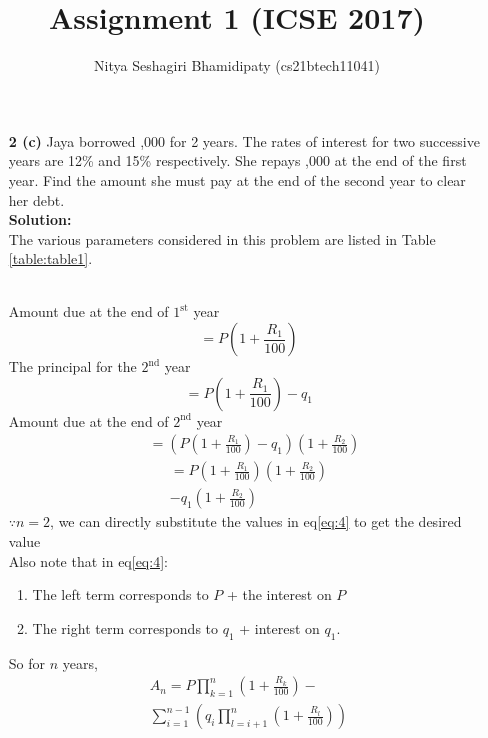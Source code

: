 \documentclass[journal,12pt,two column]{IEEEtran}
\title{Assignment 1 (ICSE 2017)}
\author{Nitya Seshagiri Bhamidipaty (cs21btech11041)}
\newcommand{\solution}{\noindent \textbf{Solution: }}
\begin{document}
\maketitle
\begin{enumerate}
\item[\textbf{2 (c)}] Jaya borrowed ,000 for 2 years. The rates of interest for two successive years are 12\% and 15\% respectively. She repays ,000 at the end of the first year. Find the amount she must pay at the end of the second year to clear her debt.\\
\solution \\
The various parameters considered in this problem are listed in Table \ref{table:table1}.
\begin{table}[h!]
\caption{}
\label{table:table1}

\end{table}
\\
Amount due at the end of $1^{\text{st}}$ year
\begin{equation}
= P\left(1+\frac{R_1}{100}\right)
\end{equation}
The principal for the $2^{\text{nd}}$ year
\begin{equation}
     = P\left(1+\frac{R_1}{100}\right) - q_1
\end{equation}
Amount due at the end of $2^{\text{nd}}$ year
\begin{align}
    &= \left (P\left(1+\frac{R_1}{100}\right) - q_1\right)\left(1 + \frac{R_2}{100}\right)
\end{align}
\begin{multline}
      = P\left(1+\frac{R_1}{100}\right)\left(1+\frac{R_2}{100}\right) \\ - q_1\left(1+\frac{R_2}{100}\right)\label{eq:4}
\end{multline}
$\because n = 2$,
we can directly substitute the values in eq\eqref{eq:4} to get the desired value\\
Also note that in eq\eqref{eq:4}:
\begin{enumerate}
        \item The left term corresponds to $P$ + the interest on $P$
        \item The right term corresponds to $q_1$ + interest on $q_1$.
\end{enumerate}
So for $n$ years, 
\begin{multline}
\label{eq:5}
A_n = P\prod_{k = 1}^{n}{\left(1+\frac{R_k}{100}\right)} -\\ \sum_{i=1}^{n-1}{\left(q_i\prod_{l=i+1}^{n}{\left(1+\frac{R_l}{100}\right)}\right)}

\end{multline}
\end{enumerate}
\end{document}
